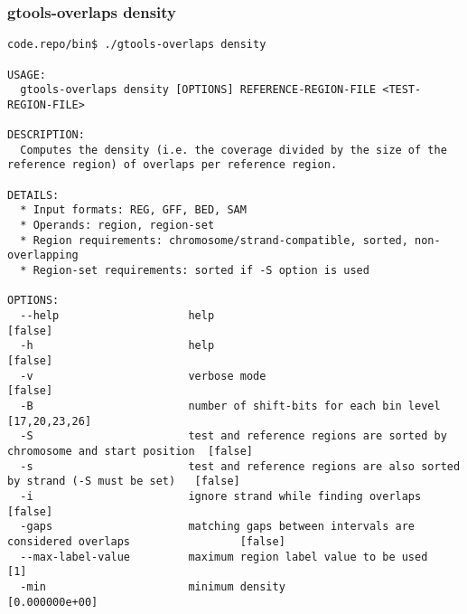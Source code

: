 \subsubsection{gtools-overlaps density}\label{gtools-overlaps_density}
\begin{lstlisting}
code.repo/bin$ ./gtools-overlaps density

USAGE:
  gtools-overlaps density [OPTIONS] REFERENCE-REGION-FILE <TEST-REGION-FILE>

DESCRIPTION:
  Computes the density (i.e. the coverage divided by the size of the reference region) of overlaps per reference region.

DETAILS:
  * Input formats: REG, GFF, BED, SAM
  * Operands: region, region-set
  * Region requirements: chromosome/strand-compatible, sorted, non-overlapping
  * Region-set requirements: sorted if -S option is used

OPTIONS:
  --help                    help                                                                    [false]
  -h                        help                                                                    [false]
  -v                        verbose mode                                                            [false]
  -B                        number of shift-bits for each bin level                                 [17,20,23,26]
  -S                        test and reference regions are sorted by chromosome and start position  [false]
  -s                        test and reference regions are also sorted by strand (-S must be set)   [false]
  -i                        ignore strand while finding overlaps                                    [false]
  -gaps                     matching gaps between intervals are considered overlaps                 [false]
  --max-label-value         maximum region label value to be used                                   [1]
  -min                      minimum density                                                         [0.000000e+00]
\end{lstlisting}
%
